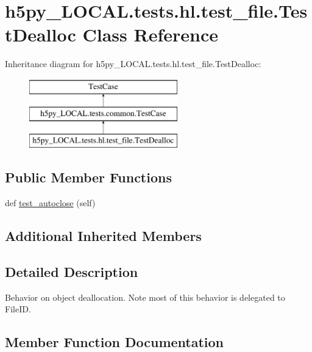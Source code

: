 \hypertarget{classh5py__LOCAL_1_1tests_1_1hl_1_1test__file_1_1TestDealloc}{}\section{h5py\+\_\+\+L\+O\+C\+A\+L.\+tests.\+hl.\+test\+\_\+file.\+Test\+Dealloc Class Reference}
\label{classh5py__LOCAL_1_1tests_1_1hl_1_1test__file_1_1TestDealloc}
Inheritance diagram for h5py\+\_\+\+L\+O\+C\+A\+L.\+tests.\+hl.\+test\+\_\+file.\+Test\+Dealloc\+:\begin{figure}[H]
\begin{center}
\leavevmode
\includegraphics[height=3.000000cm]{classh5py__LOCAL_1_1tests_1_1hl_1_1test__file_1_1TestDealloc}
\end{center}
\end{figure}
\subsection*{Public Member Functions}
\begin{DoxyCompactItemize}
\item 
def \hyperlink{classh5py__LOCAL_1_1tests_1_1hl_1_1test__file_1_1TestDealloc_aecc41a21ca498beb7544d6a103019caa}{test\+\_\+autoclose} (self)
\end{DoxyCompactItemize}
\subsection*{Additional Inherited Members}


\subsection{Detailed Description}
\begin{DoxyVerb}    Behavior on object deallocation.  Note most of this behavior is
    delegated to FileID.
\end{DoxyVerb}
 

\subsection{Member Function Documentation}
\mbox{\label{classh5py__LOCAL_1_1tests_1_1hl_1_1test__file_1_1TestDealloc_aecc41a21ca498beb7544d6a103019caa}} 
